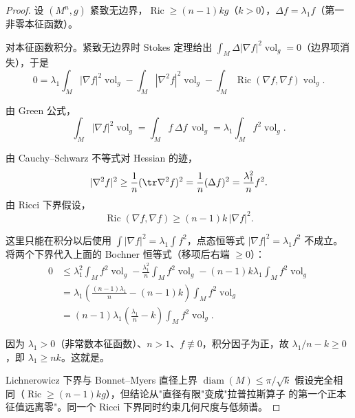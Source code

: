 \begin{proof}
设 $(M^n,g)$ 紧致无边界，$\operatorname{Ric}\ge(n-1)kg$（$k>0$），$\Delta f=\lambda_1 f$（第一非零本征函数）。

对本征函数积分。紧致无边界时 Stokes 定理给出 $\int_M\Delta|\nabla f|^2\operatorname{vol}_g=0$（边界项消失），于是
\begin{equation*}
 0
 =\lambda_1\int_M|\nabla f|^2\operatorname{vol}_g
 -\int_M|\nabla^2f|^2\operatorname{vol}_g
 -\int_M\operatorname{Ric}(\nabla f,\nabla f)\operatorname{vol}_g.
\end{equation*}

由 Green 公式，
\begin{equation*}
 \int_M|\nabla f|^2\operatorname{vol}_g
 =\int_M f\,\Delta f\,\operatorname{vol}_g
 =\lambda_1\int_M f^2\operatorname{vol}_g.
\end{equation*}

由 Cauchy--Schwarz 不等式对 Hessian 的迹，
\begin{equation*}
 |\nabla^2 f|^2\ge\frac{1}{n}(\tr\nabla^2f)^2
 =\frac{1}{n}(\Delta f)^2
 =\frac{\lambda_1^2}{n}f^2.
\end{equation*}
由 Ricci 下界假设，
\begin{equation*}
 \operatorname{Ric}(\nabla f,\nabla f)\ge(n-1)k\,|\nabla f|^2.
\end{equation*}

这里只能在积分以后使用
$\int|\nabla f|^2=\lambda_1\int f^2$，点态恒等式 $|\nabla f|^2=\lambda_1f^2$ 不成立。
将两个下界代入上面的 Bochner 恒等式（移项后右端 $\ge0$）：
\begin{align*}
 0
 &\le \lambda_1^2\int_Mf^2\operatorname{vol}_g
  -\frac{\lambda_1^2}{n}\int_Mf^2\operatorname{vol}_g
  -(n-1)k\lambda_1\int_Mf^2\operatorname{vol}_g\\
 &=\lambda_1\left(\frac{(n-1)\lambda_1}{n}-(n-1)k\right)\int_Mf^2\operatorname{vol}_g\\
 &=(n-1)\lambda_1\left(\frac{\lambda_1}{n}-k\right)\int_Mf^2\operatorname{vol}_g.
\end{align*}

因为 $\lambda_1>0$（非常数本征函数）、$n>1$、$f\not\equiv0$，积分因子为正，故 $\lambda_1/n-k\ge0$，即 $\lambda_1\ge nk$。这就是。

Lichnerowicz 下界与 Bonnet--Myers 直径上界 $\operatorname{diam}(M)\le\pi/\sqrt{k}$ 假设完全相同（$\operatorname{Ric}\ge(n-1)kg$），但结论从"直径有限"变成"拉普拉斯算子 的第一个正本征值远离零"。同一个 Ricci 下界同时约束几何尺度与低频谱。
\end{proof}

